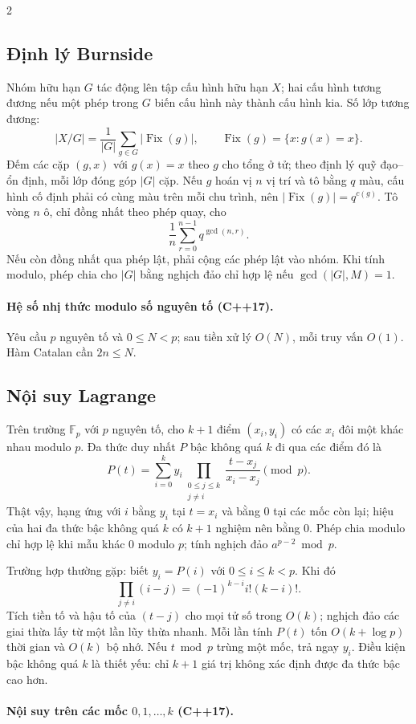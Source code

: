 \begin{multicols}{2}
\subsection{Định lý Burnside}
Nhóm hữu hạn $G$ tác động lên tập cấu hình hữu hạn $X$; hai
cấu hình tương đương nếu một phép trong $G$ biến cấu hình này
thành cấu hình kia. Số lớp tương đương:
\[
|X/G|=\frac{1}{|G|}\sum_{g\in G}|\operatorname{Fix}(g)|,\qquad
\operatorname{Fix}(g)=\{x:g(x)=x\}.
\]
Đếm các cặp $(g,x)$ với $g(x)=x$ theo $g$ cho tổng ở tử;
theo định lý quỹ đạo--ổn định, mỗi lớp đóng góp $|G|$ cặp.
Nếu $g$ hoán vị $n$ vị trí và tô bằng $q$ màu, cấu hình cố định
phải có cùng màu trên mỗi chu trình, nên
$|\operatorname{Fix}(g)|=q^{c(g)}$. Tô vòng $n$ ô, chỉ đồng nhất
theo phép quay, cho
\[
\frac1n\sum_{r=0}^{n-1}q^{\gcd(n,r)}.
\]
Nếu còn đồng nhất qua phép lật, phải cộng các phép lật vào nhóm.
Khi tính modulo, phép chia cho $|G|$ bằng nghịch đảo chỉ hợp lệ
nếu $\gcd(|G|,M)=1$.

\paragraph{Hệ số nhị thức modulo số nguyên tố (C++17).}
Yêu cầu $p$ nguyên tố và $0\le N<p$; sau tiền xử lý $O(N)$,
mỗi truy vấn $O(1)$. Hàm Catalan cần $2n\le N$.

\subsection{Nội suy Lagrange}
Trên trường $\mathbb F_p$ với $p$ nguyên tố, cho $k+1$ điểm
$(x_i,y_i)$ có các $x_i$ đôi một khác nhau modulo $p$.
Đa thức duy nhất $P$ bậc không quá $k$ đi qua các điểm đó là
\[
P(t)=\sum_{i=0}^{k} y_i
\prod_{\substack{0\le j\le k\\j\ne i}}
\frac{t-x_j}{x_i-x_j}\pmod p.
\]
Thật vậy, hạng ứng với $i$ bằng $y_i$ tại $t=x_i$ và bằng $0$
tại các mốc còn lại; hiệu của hai đa thức bậc không quá $k$
có $k+1$ nghiệm nên bằng $0$. Phép chia modulo chỉ hợp lệ khi
mẫu khác $0$ modulo $p$; tính nghịch đảo $a^{p-2}\bmod p$.

Trường hợp thường gặp: biết $y_i=P(i)$ với $0\le i\le k<p$.
Khi đó
\[
\prod_{j\ne i}(i-j)=(-1)^{k-i}i!(k-i)!.
\]
Tích tiền tố và hậu tố của $(t-j)$ cho mọi tử số trong $O(k)$;
nghịch đảo các giai thừa lấy từ một lần lũy thừa nhanh.
Mỗi lần tính $P(t)$ tốn $O(k+\log p)$ thời gian và $O(k)$ bộ nhớ.
Nếu $t\bmod p$ trùng một mốc, trả ngay $y_i$.
Điều kiện bậc không quá $k$ là thiết yếu: chỉ $k+1$ giá trị
không xác định được đa thức bậc cao hơn.

\paragraph{Nội suy trên các mốc $0,1,\ldots,k$ (C++17).}
\end{multicols}
\endgroup
